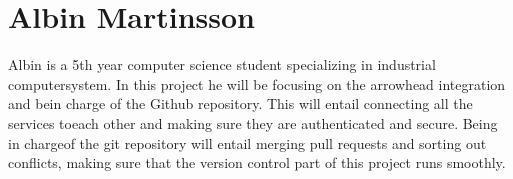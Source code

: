 \section*{Albin Martinsson}
Albin is a 5th year computer science student specializing in industrial computersystem. 
In this project he will be focusing on the arrowhead integration and bein charge of the Github repository.  
This will entail connecting all the services toeach other and making sure they are authenticated and secure.  
Being in chargeof the git repository will entail merging pull requests and sorting out conflicts,
making sure that the version control part of this project runs smoothly.